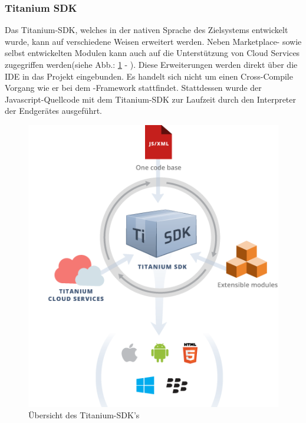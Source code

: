 \documentclass[../Bachelorarbeit.tex]{subfiles}
\begin{document}
\subsubsection*{Titanium \ac{SDK}}
\label{subsub:titanium_sdk}
Das Titanium-\ac{SDK}, welches in der nativen Sprache des Zielsystems entwickelt wurde, kann auf verschiedene Weisen erweitert werden. 
Neben Marketplace- sowie selbst entwickelten Modulen kann auch auf die Unterstützung von Cloud Services zugegriffen werden(siehe Abb.: \ref{fig:Titanium-Sdk} - ). 
Diese Erweiterungen werden direkt über die \ac{IDE}  in das Projekt eingebunden.
Es handelt sich nicht um einen Cross-Compile Vorgang wie er bei dem -Framework stattfindet. 
Stattdessen wurde der Javascript-Quellcode mit dem Titanium-\ac{SDK} zur Laufzeit durch den Interpreter der Endgerätes ausgeführt.

\begin{figure}
\centering
\includegraphics[width=0.6\linewidth]{./img/Titanium-Sdk}
\caption[Titanium \ac{SDK}]{Übersicht des Titanium-\ac{SDK}'s \parencite[Quelle:][]{titanium_sdk}}
\label{fig:Titanium-Sdk}
\end{figure}
\end{document}
